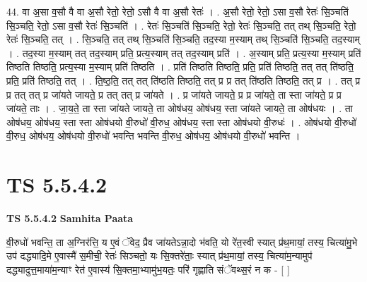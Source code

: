 \documentclass[17pt]{extarticle}
\begin{document}
44. वा अ॒सा व॒सौ वै वा अ॒सौ रेतो॒ रेतो॒ ऽसौ वै वा अ॒सौ रेतः॑ । . अ॒सौ रेतो॒ रेतो॒ ऽसा व॒सौ रेतः॑ सि॒ञ्चति॑ सि॒ञ्चति॒ रेतो॒ ऽसा व॒सौ रेतः॑ सि॒ञ्चति॑ । . रेतः॑ सि॒ञ्चति॑ सि॒ञ्चति॒ रेतो॒ रेतः॑ सि॒ञ्चति॒ तत् तथ् सि॒ञ्चति॒ रेतो॒ रेतः॑ सि॒ञ्चति॒ तत् । . सि॒ञ्चति॒ तत् तथ् सि॒ञ्चति॑ सि॒ञ्चति॒ तद॒स्या म॒स्याम् तथ् सि॒ञ्चति॑ सि॒ञ्चति॒ तद॒स्याम् । . तद॒स्या म॒स्याम् तत् तद॒स्याम् प्रति॒ प्रत्य॒स्याम् तत् तद॒स्याम् प्रति॑ । . अ॒स्याम् प्रति॒ प्रत्य॒स्या म॒स्याम् प्रति॑ तिष्ठति तिष्ठति॒ प्रत्य॒स्या म॒स्याम् प्रति॑ तिष्ठति । . प्रति॑ तिष्ठति तिष्ठति॒ प्रति॒ प्रति॑ तिष्ठति॒ तत् तत् ति॑ष्ठति॒ प्रति॒ प्रति॑ तिष्ठति॒ तत् । . ति॒ष्ठ॒ति॒ तत् तत् ति॑ष्ठति तिष्ठति॒ तत् प्र प्र तत् ति॑ष्ठति तिष्ठति॒ तत् प्र । . तत् प्र प्र तत् तत् प्र जा॑यते जायते॒ प्र तत् तत् प्र जा॑यते । . प्र जा॑यते जायते॒ प्र प्र जा॑यते॒ ता स्ता जा॑यते॒ प्र प्र जा॑यते॒ ताः । . जा॒य॒ते॒ ता स्ता जा॑यते जायते॒ ता ओष॑धय॒ ओष॑धय॒ स्ता जा॑यते जायते॒ ता ओष॑धयः । . ता ओष॑धय॒ ओष॑धय॒ स्ता स्ता ओष॑धयो वी॒रुधो॑ वी॒रुध॒ ओष॑धय॒ स्ता स्ता ओष॑धयो वी॒रुधः॑ । . ओष॑धयो वी॒रुधो॑ वी॒रुध॒ ओष॑धय॒ ओष॑धयो वी॒रुधो॑ भवन्ति भवन्ति वी॒रुध॒ ओष॑धय॒ ओष॑धयो वी॒रुधो॑ भवन्ति । \newline
\pagebreak
{}

\section{ TS 5.5.4.2 }

\textbf{TS 5.5.4.2 } \newline
\textbf{Samhita Paata} \newline

वी॒रुधो॑ भवन्ति॒ ता अ॒ग्निर॑त्ति॒ य ए॒वं ॅवेद॒ प्रैव जा॑यतेऽन्ना॒दो भ॑वति॒ यो रे॑त॒स्वी स्यात् प्र॑थ॒मायां॒ तस्य॒ चित्या॑मु॒भे उप॑ दद्ध्यादि॒मे ए॒वास्मै॑ स॒मीची॒ रेतः॑ सिञ्चतो॒ यः सि॒क्तरे॑ताः॒ स्यात् प्र॑थ॒मायां॒ तस्य॒ चित्या॑म॒न्यामुप॑ दद्ध्यादुत्त॒माया॑म॒न्याꣳ रेत॑ ए॒वास्य॑ सि॒क्तमा॒भ्यामु॑भ॒यतः॒ परि॑ गृह्णाति संॅवथ्स॒रं न क - [  ] \newline
\end{document}
